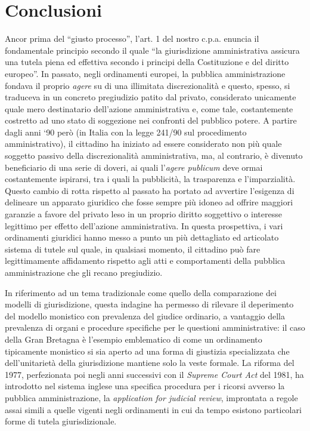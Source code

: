\documentclass[12pt,it,a4paper,]{report}
\begin{document}
\hypertarget{conclusioni}{%
\chapter{Conclusioni}\label{conclusioni}}

Ancor prima del ``giusto processo'', l'art. 1 del nostro c.p.a. enuncia
il fondamentale principio secondo il quale ``la giurisdizione
amministrativa assicura una tutela piena ed effettiva secondo i principi
della Costituzione e del diritto europeo''. In passato, negli
ordinamenti europei, la pubblica amministrazione fondava il proprio
\emph{agere} su di una illimitata discrezionalità e questo, spesso, si
traduceva in un concreto pregiudizio patito dal privato, considerato
unicamente quale mero destinatario dell'azione amministrativa e, come
tale, costantemente costretto ad uno stato di soggezione nei confronti
del pubblico potere. A partire dagli anni `90 però (in Italia con la
legge 241/90 sul procedimento amministrativo), il cittadino ha iniziato
ad essere considerato non più quale soggetto passivo della
discrezionalità amministrativa, ma, al contrario, è divenuto
beneficiario di una serie di doveri, ai quali l'\emph{agere publicum}
deve ormai costantemente ispirarsi, tra i quali la pubblicità, la
trasparenza e l'imparzialità. Questo cambio di rotta rispetto al passato
ha portato ad avvertire l'esigenza di delineare un apparato giuridico
che fosse sempre più idoneo ad offrire maggiori garanzie a favore del
privato leso in un proprio diritto soggettivo o interesse legittimo per
effetto dell'azione amministrativa. In questa prospettiva, i vari
ordinamenti giuridici hanno messo a punto un più dettagliato ed
articolato sistema di tutele sul quale, in qualsiasi momento, il
cittadino può fare legittimamente affidamento rispetto agli atti e
comportamenti della pubblica amministrazione che gli recano pregiudizio.

In riferimento ad un tema tradizionale come quello della comparazione
dei modelli di giurisdizione, questa indagine ha permesso di rilevare il
deperimento del modello monistico con prevalenza del giudice ordinario,
a vantaggio della prevalenza di organi e procedure specifiche per le
questioni amministrative: il caso della Gran Bretagna è l'esempio
emblematico di come un ordinamento tipicamente monistico si sia aperto
ad una forma di giustizia specializzata che dell'unitarietà della
giurisdizione mantiene solo la veste formale. La riforma del 1977,
perfezionata poi negli anni successivi con il \emph{Supreme Court Act}
del 1981, ha introdotto nel sistema inglese una specifica procedura per
i ricorsi avverso la pubblica amministrazione, la \emph{application for
judicial review}, improntata a regole assai simili a quelle vigenti
negli ordinamenti in cui da tempo esistono particolari forme di tutela
giurisdizionale.
\end{document}

